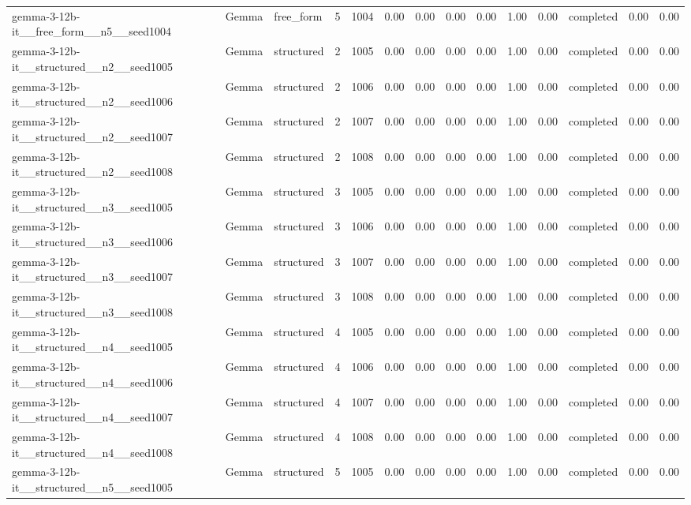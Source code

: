 \begin{longtable}{lllrrrrrrrrlrr}
gemma-3-12b-it\_\_free\_form\_\_n5\_\_seed1004 & Gemma & free\_form & 5 & 1004 & 0.00 & 0.00 & 0.00 & 0.00 & 1.00 & 0.00 & completed & 0.00 & 0.00 \\
gemma-3-12b-it\_\_structured\_\_n2\_\_seed1005 & Gemma & structured & 2 & 1005 & 0.00 & 0.00 & 0.00 & 0.00 & 1.00 & 0.00 & completed & 0.00 & 0.00 \\
gemma-3-12b-it\_\_structured\_\_n2\_\_seed1006 & Gemma & structured & 2 & 1006 & 0.00 & 0.00 & 0.00 & 0.00 & 1.00 & 0.00 & completed & 0.00 & 0.00 \\
gemma-3-12b-it\_\_structured\_\_n2\_\_seed1007 & Gemma & structured & 2 & 1007 & 0.00 & 0.00 & 0.00 & 0.00 & 1.00 & 0.00 & completed & 0.00 & 0.00 \\
gemma-3-12b-it\_\_structured\_\_n2\_\_seed1008 & Gemma & structured & 2 & 1008 & 0.00 & 0.00 & 0.00 & 0.00 & 1.00 & 0.00 & completed & 0.00 & 0.00 \\
gemma-3-12b-it\_\_structured\_\_n3\_\_seed1005 & Gemma & structured & 3 & 1005 & 0.00 & 0.00 & 0.00 & 0.00 & 1.00 & 0.00 & completed & 0.00 & 0.00 \\
gemma-3-12b-it\_\_structured\_\_n3\_\_seed1006 & Gemma & structured & 3 & 1006 & 0.00 & 0.00 & 0.00 & 0.00 & 1.00 & 0.00 & completed & 0.00 & 0.00 \\
gemma-3-12b-it\_\_structured\_\_n3\_\_seed1007 & Gemma & structured & 3 & 1007 & 0.00 & 0.00 & 0.00 & 0.00 & 1.00 & 0.00 & completed & 0.00 & 0.00 \\
gemma-3-12b-it\_\_structured\_\_n3\_\_seed1008 & Gemma & structured & 3 & 1008 & 0.00 & 0.00 & 0.00 & 0.00 & 1.00 & 0.00 & completed & 0.00 & 0.00 \\
gemma-3-12b-it\_\_structured\_\_n4\_\_seed1005 & Gemma & structured & 4 & 1005 & 0.00 & 0.00 & 0.00 & 0.00 & 1.00 & 0.00 & completed & 0.00 & 0.00 \\
gemma-3-12b-it\_\_structured\_\_n4\_\_seed1006 & Gemma & structured & 4 & 1006 & 0.00 & 0.00 & 0.00 & 0.00 & 1.00 & 0.00 & completed & 0.00 & 0.00 \\
gemma-3-12b-it\_\_structured\_\_n4\_\_seed1007 & Gemma & structured & 4 & 1007 & 0.00 & 0.00 & 0.00 & 0.00 & 1.00 & 0.00 & completed & 0.00 & 0.00 \\
gemma-3-12b-it\_\_structured\_\_n4\_\_seed1008 & Gemma & structured & 4 & 1008 & 0.00 & 0.00 & 0.00 & 0.00 & 1.00 & 0.00 & completed & 0.00 & 0.00 \\
gemma-3-12b-it\_\_structured\_\_n5\_\_seed1005 & Gemma & structured & 5 & 1005 & 0.00 & 0.00 & 0.00 & 0.00 & 1.00 & 0.00 & completed & 0.00 & 0.00 \\

\end{longtable}
